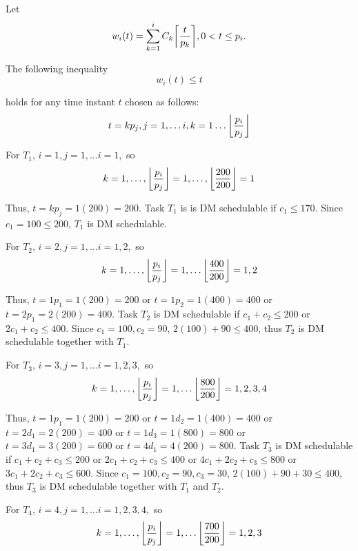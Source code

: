 \documentclass[10pt]{article}
\DeclarePairedDelimiter\ceil{\lceil}{\rceil}
\DeclarePairedDelimiter\floor{\lfloor}{\rfloor}
\begin{document}
Let
\begin{equation}
    w_i(t) = \sum_{k=1}^{i} C_k \ceil*{\frac{t}{p_k}}, 0 < t \leq p_i.
\end{equation}

The following inequality 
\begin{equation}
    w_i(t) \leq t
\end{equation}

holds for any time instant $t$  chosen as follows:
\begin{equation}
    t = kp_j, j=1,\dots i,k=1\dots \floor*{\frac{p_i}{p_j}}
\end{equation}

For $T_1$, $i = 1, j = 1,\dots i = 1,$ so 
\begin{equation}
    k = 1,\dots,\floor*{\frac{p_i}{p_j}} = 1,\dots,\floor*{\frac{200}{200}} = 1
\end{equation}

Thus, $t = kp_j = 1(200) = 200$.
Task $T_1$ is is DM schedulable if $c_1 \leq 170$. 
Since $c_1 = 100 \leq 200$, $T_1$ is DM schedulable. 

For $T_2$, $i = 2, j = 1,\dots i = 1,2,$ so
\begin{equation}
    k = 1,\dots,\floor*{\frac{p_i}{p_j}} = 1,\dots \floor*{\frac{400}{200}} = 1, 2
\end{equation}

Thus, $t = 1 p_1 = 1(200) = 200$ or $t = 1 p_2 = 1(400) = 400$ or $t = 2 p_1 = 2(200) = 400$.
Task $T_2$ is DM schedulable if $c_1 + c_2 \leq 200$ or $2c_1 + c_2 \leq 400$. 
Since $c_1 = 100, c_2 = 90$, $2(100) + 90 \leq 400$, thus $T_2$ is DM schedulable together with $T_1$.

For $T_3$, $i = 3, j = 1,\dots i = 1,2,3,$ so
\begin{equation}
    k = 1,\dots,\floor*{\frac{p_i}{p_j}} = 1,\dots \floor*{\frac{800}{200}} = 1, 2, 3, 4
\end{equation}

Thus, $t = 1 p_1 = 1(200) = 200$ or $t = 1 d_2 = 1(400) = 400$ or $t = 2 d_1 = 2(200) = 400$ or $t = 1 d_3 = 1(800) = 800$ or $t = 3 d_1 = 3(200) = 600$ or $t = 4 d_1 = 4(200) = 800$.
Task $T_3$ is DM schedulable if $c_1 + c_2 + c_3 \leq 200$ or $2c_1 + c_2 + c_3 \leq 400$ or $4c_1 + 2c_2 + c_3 \leq 800$ or $3c_1 + 2c_2 + c_3 \leq 600$. 
Since $c_1 = 100, c_2 = 90, c_3 = 30$, $2(100) + 90 + 30 \leq 400$, thus $T_3$ is DM schedulable together with $T_1$ and $T_2$.

For $T_4$, $i = 4, j = 1,\dots i = 1,2,3,4,$ so
\begin{equation}
    k = 1,\dots,\floor*{\frac{p_i}{p_j}} = 1,\dots \floor*{\frac{700}{200}} = 1, 2, 3
\end{equation}
\end{document}
